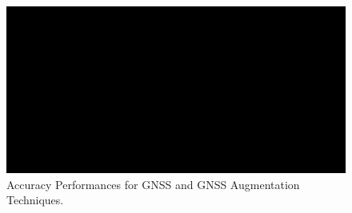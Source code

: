 
\begin{figure}[ht]
	\centering
	\includegraphics[width=1.0\textwidth]{Chapters/Figures/demo.png}
	\caption{Accuracy Performances for GNSS and GNSS Augmentation Techniques.}
	\label{fig:accuracy_perfromances}
\end{figure}

